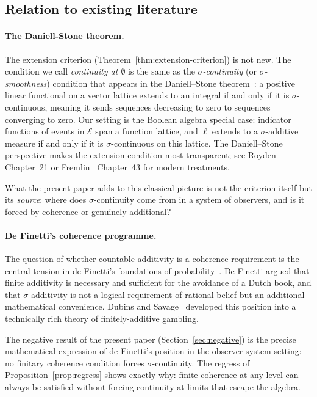 \documentclass[12pt]{article}
\theoremstyle{definition}
\theoremstyle{remark}
\newcommand{\E}{\mathcal{E}}
\begin{document}
\subsection{Relation to existing literature}

\paragraph{The Daniell-Stone theorem.}
The extension criterion (Theorem~\ref{thm:extension-criterion}) is not new.  The
condition we call \emph{continuity at $\emptyset$} is the same as the
\emph{$\sigma$-continuity} (or \emph{$\sigma$-smoothness}) condition that appears in
the Daniell--Stone theorem~\cite{Daniell1918,Stone1948}: a positive linear functional
on a vector lattice extends to an integral if and only if it is $\sigma$-continuous,
meaning it sends sequences decreasing to zero to sequences converging to zero.  Our
setting is the Boolean algebra special case: indicator functions of events in $\E$ span
a function lattice, and $\ell$ extends to a $\sigma$-additive measure if and only if
it is $\sigma$-continuous on this lattice.  The Daniell--Stone perspective makes the
extension condition most transparent; see Royden~\cite{Royden1988} Chapter~21 or
Fremlin~\cite{Fremlin2006} Chapter~43 for modern treatments.

What the present paper adds to this classical picture is not the criterion itself but
its \emph{source}: where does $\sigma$-continuity come from in a system of observers,
and is it forced by coherence or genuinely additional?

\paragraph{De Finetti's coherence programme.}
The question of whether countable additivity is a coherence requirement is the central
tension in de Finetti's foundations of probability~\cite{deFinetti1974}.  De Finetti
argued that finite additivity is necessary and sufficient for the avoidance of a Dutch
book, and that $\sigma$-additivity is not a logical requirement of rational belief
but an additional mathematical convenience.  Dubins and Savage~\cite{DubinsSavage1965}
developed this position into a technically rich theory of finitely-additive gambling.

The negative result of the present paper (Section~\ref{sec:negative}) is the precise
mathematical expression of de Finetti's position in the observer-system setting:
no finitary coherence condition forces $\sigma$-continuity.  The regress of
Proposition~\ref{prop:regress} shows exactly why: finite coherence at any level can
always be satisfied without forcing continuity at limits that escape the algebra.
\end{document}
